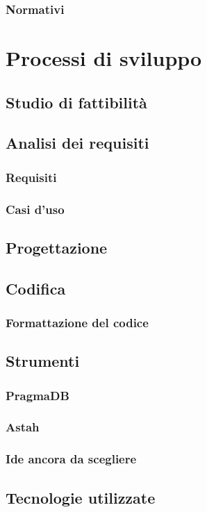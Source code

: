 		\subsubsection{Normativi}
\section{Processi di sviluppo}
	\subsection{Studio di fattibilità}
	\subsection{Analisi dei requisiti}
		\subsubsection{Requisiti}
		\subsubsection{Casi d'uso}
	\subsection{Progettazione}
	\subsection{Codifica}
		\subsubsection{Formattazione del codice}
	\subsection{Strumenti}
		\subsubsection{PragmaDB}
		\subsubsection{Astah}
		\subsubsection{Ide ancora da scegliere}
	\subsection{Tecnologie utilizzate}
